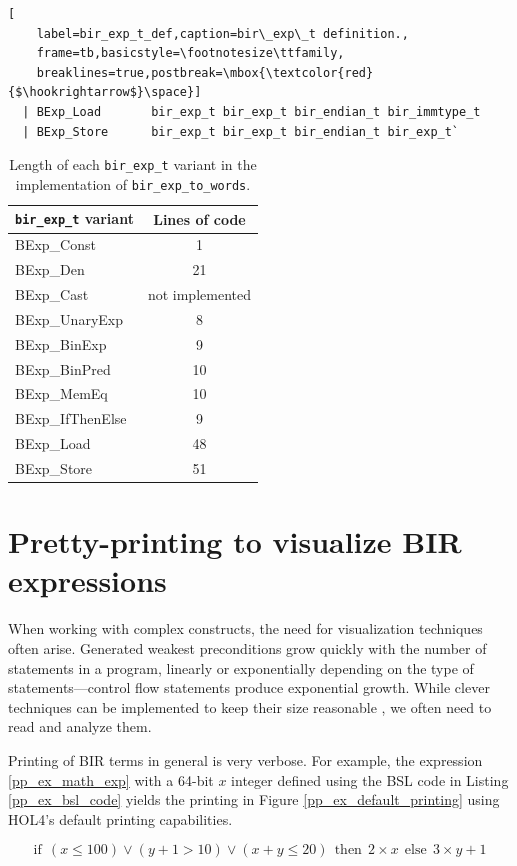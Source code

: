 \documentclass{kththesis}
\begin{document}
{\begin{lstlisting}[
    label=bir_exp_t_def,caption=bir\_exp\_t definition.,
    frame=tb,basicstyle=\footnotesize\ttfamily,
    breaklines=true,postbreak=\mbox{\textcolor{red}{$\hookrightarrow$}\space}]
  | BExp_Load       bir_exp_t bir_exp_t bir_endian_t bir_immtype_t
  | BExp_Store      bir_exp_t bir_exp_t bir_endian_t bir_exp_t`
\end{lstlisting}

\begin{table}[ht!]
    \centering
    \begin{tabular}{ | l | c | }
        \hline
        \texttt{bir\_exp\_t} variant & Lines of code\\
        \hline
        BExp\_Const & 1\\
        BExp\_Den & 21\\
        BExp\_Cast & not implemented\\
        BExp\_UnaryExp & 8\\
        BExp\_BinExp & 9\\
        BExp\_BinPred & 10\\
        BExp\_MemEq & 10\\
        BExp\_IfThenElse & 9\\
        BExp\_Load & 48\\
        BExp\_Store & 51\\
        \hline
    \end{tabular}
    \caption{Length of each \texttt{bir\_exp\_t} variant in the implementation of \texttt{bir\_exp\_to\_words}.}
    \label{bir_exp_to_words_variants_loc}
\end{table}

\section{Pretty-printing to visualize BIR expressions} \label{pretty-printers}

When working with complex constructs, the need for visualization techniques often arise. Generated weakest preconditions grow quickly with the number of statements in a program, linearly or exponentially depending on the type of statements---control flow statements produce exponential growth. While clever techniques can be implemented to keep their size reasonable \cite{lindner_trabin:_2019}, we often need to read and analyze them.

Printing of BIR terms in general is very verbose. For example, the expression \ref{pp_ex_math_exp} with a 64-bit $x$ integer defined using the BSL code in Listing \ref{pp_ex_bsl_code} yields the printing in Figure \ref{pp_ex_default_printing} using HOL4's default printing capabilities.

\begin{equation}
    \text{if}~~(x \leq 100) \lor (y + 1 > 10) \lor (x + y \leq 20)~~\text{then}~~2 \times x~~\text{else}~~3 \times y + 1
    \label{pp_ex_math_exp}
\end{equation}

}
\end{document}
